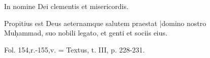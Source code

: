 \documentclass[11pt]{article}
\begin{document}
\clearpage
\begin{center}In nomine Dei clementis et misericordis.\end{center}
\begin{center}Propitius est Deus aeternamque salutem praestat |domino nostro\\Muḥammad, suo nobili legato, et genti et sociis eius.\end{center}
\begin{center}\small Fol. 154,r.-155,v. = Textus, t. III, p. 228-231.\end{center}
\begin{center}\end{center}
\end{document}

